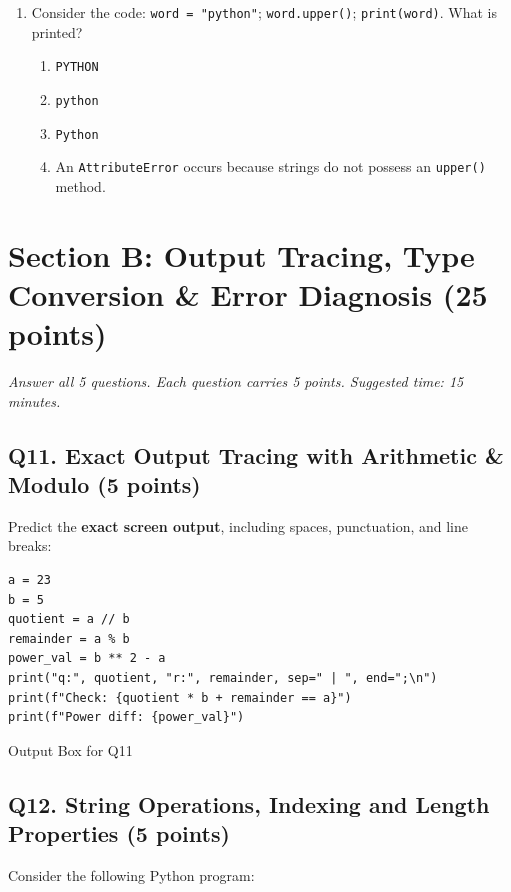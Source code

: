 \documentclass[11pt,a4paper]{article}
\begin{document}
\begin{enumerate}[label=\textbf{Q\arabic*.},leftmargin=2em,itemsep=2pt,topsep=1pt,resume]
\item Consider the code: \texttt{word = "python"}; \texttt{word.upper()}; \texttt{print(word)}. What is printed?
\begin{enumerate}[label=\Alph*.,leftmargin=2em]
  \item \texttt{PYTHON}
  \item \texttt{python}
  \item \texttt{Python}
  \item An \texttt{AttributeError} occurs because strings do not possess an \texttt{upper()} method.
\end{enumerate}

\end{enumerate}

\section*{Section B: Output Tracing, Type Conversion \& Error Diagnosis \hfill \normalsize\normalfont(25 points)}
\textit{Answer all 5 questions. Each question carries 5 points. Suggested time: 15 minutes.}

\subsection*{Q11. Exact Output Tracing with Arithmetic \& Modulo (5 points)}
Predict the \textbf{exact screen output}, including spaces, punctuation, and line breaks:

\begin{lstlisting}
a = 23
b = 5
quotient = a // b
remainder = a % b
power_val = b ** 2 - a
print("q:", quotient, "r:", remainder, sep=" | ", end=";\n")
print(f"Check: {quotient * b + remainder == a}")
print(f"Power diff: {power_val}")
\end{lstlisting}

\begin{answerbox}[height=3.0cm]{Output Box for Q11}
\end{answerbox}

\newpage


\subsection*{Q12. String Operations, Indexing and Length Properties (5 points)}
Consider the following Python program:
\end{document}
